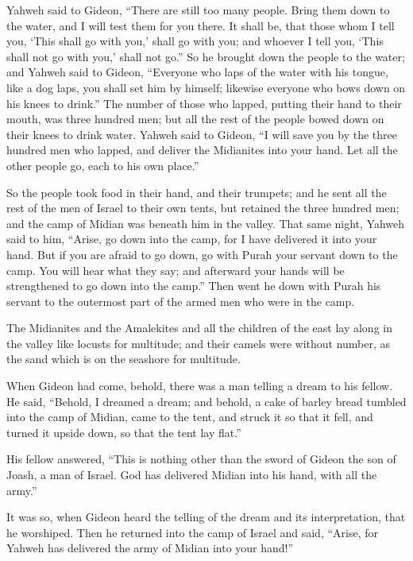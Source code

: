 Yahweh said to Gideon, ``There are still too many people.
Bring them down to the water, and I will test them for you there. It
shall be, that those whom I tell you, `This shall go with you,' shall go
with you; and whoever I tell you, `This shall not go with you,' shall
not go.''  So he brought down the people to the water; and
Yahweh said to Gideon, ``Everyone who laps of the water with his tongue,
like a dog laps, you shall set him by himself; likewise everyone who
bows down on his knees to drink.''  The number of those who
lapped, putting their hand to their mouth, was three hundred men; but
all the rest of the people bowed down on their knees to drink water.
 Yahweh said to Gideon, ``I will save you by the three
hundred men who lapped, and deliver the Midianites into your hand. Let
all the other people go, each to his own place.''

 So the people took food in their hand, and their trumpets;
and he sent all the rest of the men of Israel to their own tents, but
retained the three hundred men; and the camp of Midian was beneath him
in the valley.  That same night, Yahweh said to him,
``Arise, go down into the camp, for I have delivered it into your hand.
 But if you are afraid to go down, go with Purah your
servant down to the camp.  You will hear what they say; and
afterward your hands will be strengthened to go down into the camp.''
Then went he down with Purah his servant to the outermost part of the
armed men who were in the camp.

 The Midianites and the Amalekites and all the children of
the east lay along in the valley like locusts for multitude; and their
camels were without number, as the sand which is on the seashore for
multitude.

 When Gideon had come, behold, there was a man telling a
dream to his fellow. He said, ``Behold, I dreamed a dream; and behold, a
cake of barley bread tumbled into the camp of Midian, came to the tent,
and struck it so that it fell, and turned it upside down, so that the
tent lay flat.''

 His fellow answered, ``This is nothing other than the
sword of Gideon the son of Joash, a man of Israel. God has delivered
Midian into his hand, with all the army.''

 It was so, when Gideon heard the telling of the dream and
its interpretation, that he worshiped. Then he returned into the camp of
Israel and said, ``Arise, for Yahweh has delivered the army of Midian
into your hand!''

